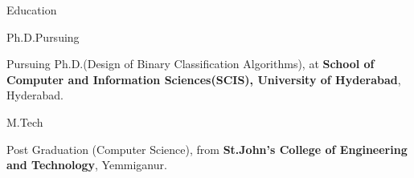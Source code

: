 \documentclass{resume} %
\begin{document}

\begin{rSection}{Education}
	
\begin{rSubsection}{Ph.D.}{Pursuing}{}{}	
	\item Pursuing Ph.D.(Design of Binary Classification Algorithms), at \textbf{School of Computer and Information Sciences(SCIS), University of Hyderabad}, Hyderabad.
\end{rSubsection}

\begin{rSubsection}{M.Tech}{}{}{}%
	\item Post Graduation (Computer Science), from \textbf{St.John's College of Engineering and Technology}, Yemmiganur.
\end{rSubsection}



\end{rSection}


\end{document}
